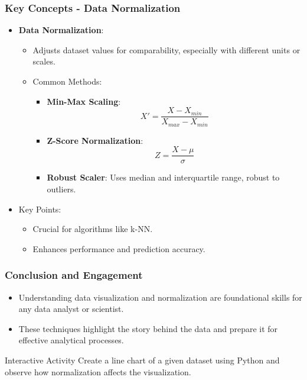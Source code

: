 \documentclass[aspectratio=169]{beamer}
\begin{document}
\begin{frame}[fragile]
    \frametitle{Key Concepts - Data Normalization}
    \begin{itemize}
        \item \textbf{Data Normalization}:
        \begin{itemize}
            \item Adjusts dataset values for comparability, especially with different units or scales.
            \item Common Methods:
                \begin{itemize}
                    \item \textbf{Min-Max Scaling}:
                    \[
                    X' = \frac{X - X_{min}}{X_{max} - X_{min}}
                    \]
                    \item \textbf{Z-Score Normalization}:
                    \[
                    Z = \frac{X - \mu}{\sigma}
                    \]
                    \item \textbf{Robust Scaler}: Uses median and interquartile range, robust to outliers.
                \end{itemize}
        \end{itemize}
        \item Key Points:
        \begin{itemize}
            \item Crucial for algorithms like k-NN.
            \item Enhances performance and prediction accuracy.
        \end{itemize}
    \end{itemize}
\end{frame}

\begin{frame}[fragile]
    \frametitle{Conclusion and Engagement}
    \begin{itemize}
        \item Understanding data visualization and normalization are foundational skills for any data analyst or scientist.
        \item These techniques highlight the story behind the data and prepare it for effective analytical processes.
    \end{itemize}
    \begin{block}{Interactive Activity}
        Create a line chart of a given dataset using Python and observe how normalization affects the visualization.
    \end{block}
\end{frame}
\end{document}
